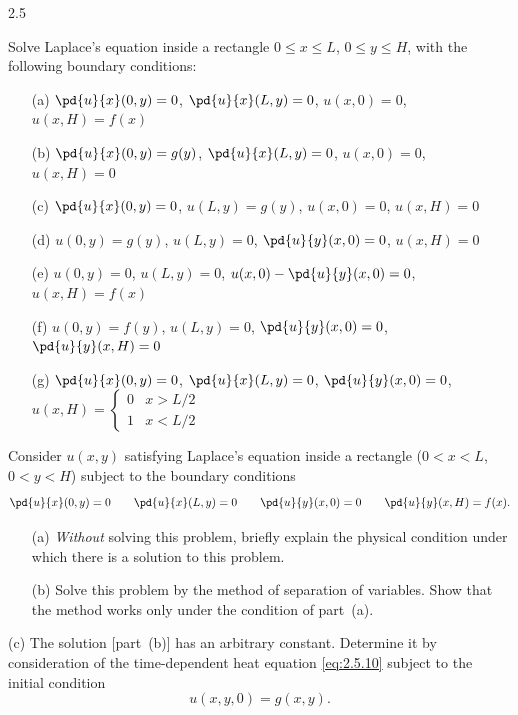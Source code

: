 \begin{exercises}{2.5}

\item Solve Laplace's equation inside a rectangle $0 \le x \le L$, $0 \le y \le H$, with the following boundary conditions:
\begin{enumerate}
\item[\starred(a)] $\pd{u}{x}(0,y) = 0$, \quad $\pd{u}{x}(L,y) = 0$, \quad $u(x,0) = 0$, \quad $u(x,H) = f(x)$
\item[(b)] $\pd{u}{x}(0,y) = g(y)$, \quad $\pd{u}{x}(L,y) = 0$, \quad $u(x,0) = 0$, \quad $u(x,H) = 0$
\item[\starred(c)] $\pd{u}{x}(0,y) = 0$, \quad $u(L,y) = g(y)$, \quad $u(x,0) = 0$, \quad $u(x,H) = 0$
\item[(d)] $u(0,y) = g(y)$, \quad $u(L,y) = 0$, \quad $\pd{u}{y}(x,0) = 0$, \quad $u(x,H) = 0$
\item[\starred(e)] $u(0,y) = 0$, \quad $u(L,y) = 0$, \quad $u(x,0) - \pd{u}{y}(x,0) = 0$, \quad $u(x,H) = f(x)$
\item[(f)] $u(0,y) = f(y)$, \quad $u(L,y) = 0$, \quad $\pd{u}{y}(x,0) = 0$, \quad $\pd{u}{y}(x,H) = 0$
\item[(g)] $\pd{u}{x}(0,y) = 0$, \quad $\pd{u}{x}(L,y) = 0$, \quad $\pd{u}{y}(x,0) = 0$, \quad $u(x,H) = \begin{cases} 0 & x > L/2 \\ 1 & x < L/2 \end{cases}$
\end{enumerate}

\item Consider $u(x,y)$ satisfying Laplace's equation inside a rectangle ($0 < x < L$, $0 < y < H$) subject to the boundary conditions
\[
\pd{u}{x}(0,y) = 0 \qquad \pd{u}{x}(L,y) = 0 \qquad \pd{u}{y}(x,0) = 0 \qquad \pd{u}{y}(x,H) = f(x).
\]
\begin{enumerate}
\item[\starred(a)] \emph{Without} solving this problem, briefly explain the physical condition under which there is a solution to this problem.
\item[(b)] Solve this problem by the method of separation of variables. Show that the method works only under the condition of part~(a).
\end{enumerate}
\item[(c)] The solution [part~(b)] has an arbitrary constant. Determine it by consideration of the time-dependent heat equation \eqref{eq:2.5.10} subject to the initial condition
\[
u(x,y,0) = g(x,y).
\]


\end{exercises}
